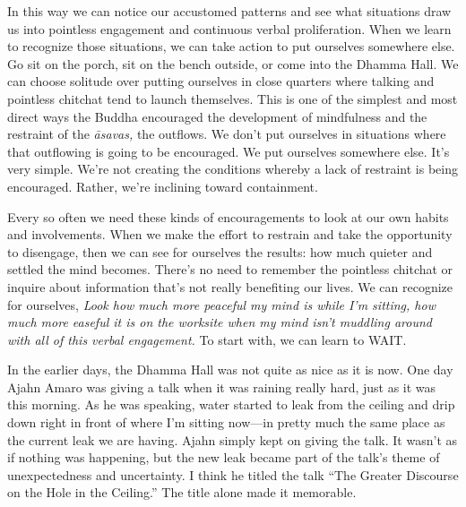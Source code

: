 In this way we can notice our accustomed patterns and see what 
situations draw us into pointless engagement and continuous verbal 
proliferation. When we learn to recognize those situations, we can take 
action to put ourselves somewhere else. Go sit on the porch, sit on the 
bench outside, or come into the Dhamma Hall. We can choose solitude 
over putting ourselves in close quarters where talking and pointless 
chitchat tend to launch themselves. This is one of the simplest and 
most direct ways the Buddha encouraged the development of mindfulness 
and the restraint of the \emph{āsavas,} the outflows. We don't put 
ourselves in situations where that outflowing is going to be 
encouraged. We put ourselves somewhere else. It's very simple. We're 
not creating the conditions whereby a lack of restraint is being 
encouraged. Rather, we're inclining toward containment.

Every so often we need these kinds of encouragements to look at our own 
habits and involvements. When we make the effort to restrain and take 
the opportunity to disengage, then we can see for ourselves the 
results: how much quieter and settled the mind becomes. There's no need 
to remember the pointless chitchat or inquire about information that's 
not really benefiting our lives. We can recognize for ourselves, 
\emph{Look how much more peaceful my mind is while I'm sitting, how 
much more easeful it is on the worksite when my mind isn't muddling 
around with all of this verbal engagement.} To start with, we can learn 
to WAIT.


In the earlier days, the Dhamma Hall was not quite as nice as it is 
now. One day Ajahn Amaro was giving a talk when it was raining really 
hard, just as it was this morning. As he was speaking, water started to 
leak from the ceiling and drip down right in front of where I'm sitting 
now---in pretty much the same place as the current leak we are having. 
Ajahn simply kept on giving the talk. It wasn't as if nothing was 
happening, but the new leak became part of the talk's theme of 
unexpectedness and uncertainty. I think he titled the talk ``The 
Greater Discourse on the Hole in the Ceiling.'' The title alone made it 
memorable.

